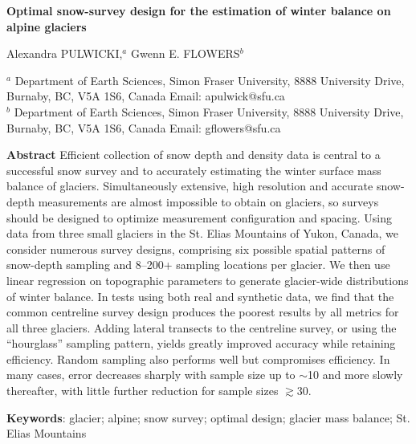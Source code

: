 \documentclass{article}
\begin{document}
\begin{center}
{\Large \textbf{Optimal snow-survey design for the estimation of winter balance on alpine glaciers}}
\vspace{0.5cm} 

\noindent Alexandra PULWICKI,$^a$ Gwenn E. FLOWERS$^b$
\vspace{0.5cm} 
\end{center}

\noindent $^a$ Department of Earth Sciences, Simon Fraser University, 8888 University Drive, Burnaby, BC, V5A 1S6, Canada Email: apulwick@sfu.ca\\
\noindent  $^b$ Department of Earth Sciences, Simon Fraser University, 8888 University Drive, Burnaby, BC, V5A 1S6, Canada  Email: gflowers@sfu.ca
\vspace{0.5cm} 


\noindent \textbf{Abstract} Efficient collection of snow depth and density data is central to a successful snow survey and to accurately estimating  the winter surface mass balance of glaciers. Simultaneously extensive, high resolution and accurate snow-depth measurements are almost impossible to obtain on glaciers, so surveys should be designed to optimize measurement configuration and spacing. 
Using data from three small glaciers in the St. Elias Mountains of Yukon, Canada,
we consider numerous survey designs, comprising six possible spatial patterns of snow-depth sampling and 8--200+  sampling locations per glacier. We then use linear regression on topographic parameters to generate glacier-wide distributions of winter balance. In tests using both real and synthetic data, we find that the common centreline survey design produces the poorest results by all metrics for all three glaciers. Adding lateral transects to the centreline survey, or using the ``hourglass'' sampling pattern, yields greatly improved accuracy while retaining efficiency. Random sampling also performs well but compromises efficiency.  
In many cases, error decreases sharply with sample size up to $\sim$10 and more slowly thereafter, with little further reduction for sample sizes $\gtrsim 30$. 

\vspace{0.3cm} 
\textbf{Keywords}: glacier; alpine; snow survey; optimal design; glacier mass balance; St. Elias Mountains

\pagebreak
\end{document}
